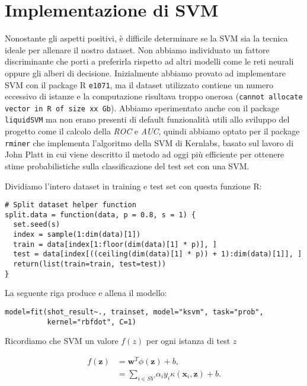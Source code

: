\section{Implementazione di SVM}

Nonostante gli aspetti positivi, è difficile determinare se la SVM sia la tecnica ideale per allenare il nostro dataset. Non abbiamo individuato un fattore discriminante che porti a preferirla rispetto ad altri modelli come le reti neurali oppure gli alberi di decisione.
Inizialmente abbiamo provato ad implementare SVM con il package R \texttt{e1071}, ma il dataset utilizzato contiene un numero eccessivo di istanze e la computazione risultava troppo onerosa (\texttt{cannot allocate vector in R of size xx Gb}). Abbiamo sperimentato anche con il package \texttt{liquidSVM} ma non erano presenti di default funzionalità utili allo sviluppo del progetto come il calcolo della \textit{ROC} e \textit{AUC}, quindi abbiamo optato per il package \texttt{rminer} che implementa l’algoritmo della SVM di Kernlabs, basato sul lavoro di John Platt \cite{Platt99probabilisticoutputs} in cui viene descritto il metodo ad oggi più efficiente per ottenere stime probabilistiche sulla classificazione del test set con una SVM.

Dividiamo l'intero dataset in training e test set con questa funzione R:

\begin{verbatim}
# Split dataset helper function
split.data = function(data, p = 0.8, s = 1) {
  set.seed(s)
  index = sample(1:dim(data)[1])
  train = data[index[1:floor(dim(data)[1] * p)], ]
  test = data[index[((ceiling(dim(data)[1] * p)) + 1):dim(data)[1]], ]
  return(list(train=train, test=test))
}
\end{verbatim}

La seguente riga produce e allena il modello:

\begin{verbatim}
model=fit(shot_result~., trainset, model="ksvm", task="prob", 
          kernel="rbfdot", C=1)
\end{verbatim}

Ricordiamo che SVM un valore $ f(z) $ per ogni istanza di test $z$

\begin{align}
f(\mathbf{z}) &= \mathbf{w}^T\phi(\mathbf{z}) + b, \\
&= \sum_{i\in SV} \alpha_i y_i \kappa(\mathbf{x}_i,\mathbf{z}) + b.
\end{align}

